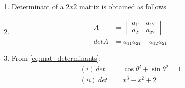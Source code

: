 \renewcommand{\theequation}{\theenumi}
\begin{enumerate}

\item \begin{flushleft}
Determinant of a $2 x 2 $ matrix is obtained as follows
\end{flushleft}

\item \begin{align}
A &= \begin{vmatrix} \nonumber
a_{11}& a_{12}\\
a_{21}& a_{22}
\end{vmatrix}\\
detA &= a_{11}a_{22}-a_{12}a_{21}\label{eq:mat_determinants}
\end{align}
\item From \ref{eq:mat_determinants}:
\begin{align}
(i)\ det &= \cos{\theta}^2 + \sin{\theta}^2 = 1 \\
(ii)\  det &= x^3 - x^2 + 2
\end{align}
\end{enumerate}

